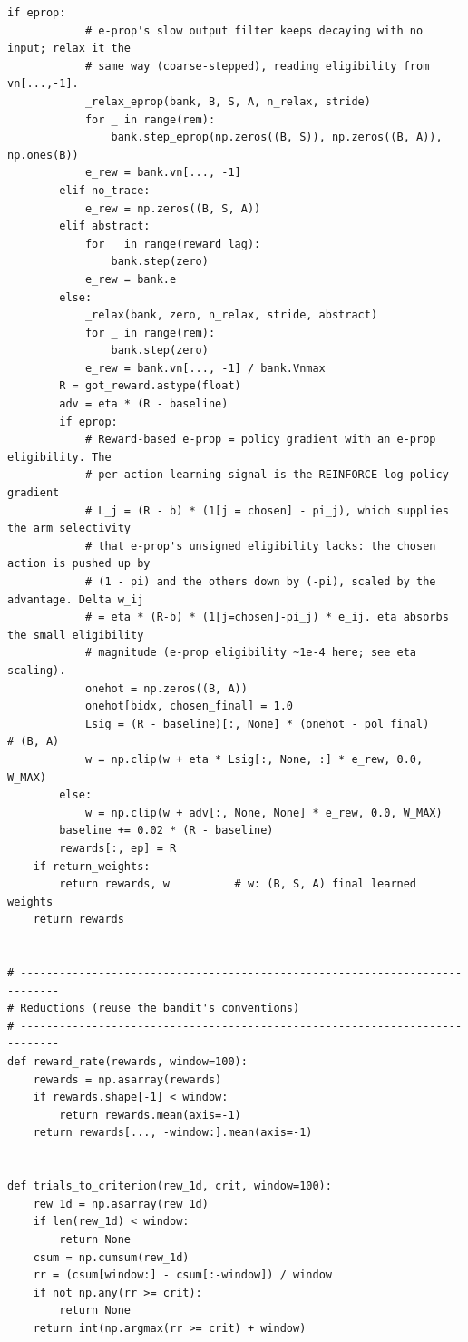 \begin{lstlisting}[caption={mrl\_trace/maze.py},label={lst:siox-src-maze}]
        if eprop:
            # e-prop's slow output filter keeps decaying with no input; relax it the
            # same way (coarse-stepped), reading eligibility from vn[...,-1].
            _relax_eprop(bank, B, S, A, n_relax, stride)
            for _ in range(rem):
                bank.step_eprop(np.zeros((B, S)), np.zeros((B, A)), np.ones(B))
            e_rew = bank.vn[..., -1]
        elif no_trace:
            e_rew = np.zeros((B, S, A))
        elif abstract:
            for _ in range(reward_lag):
                bank.step(zero)
            e_rew = bank.e
        else:
            _relax(bank, zero, n_relax, stride, abstract)
            for _ in range(rem):
                bank.step(zero)
            e_rew = bank.vn[..., -1] / bank.Vnmax
        R = got_reward.astype(float)
        adv = eta * (R - baseline)
        if eprop:
            # Reward-based e-prop = policy gradient with an e-prop eligibility. The
            # per-action learning signal is the REINFORCE log-policy gradient
            # L_j = (R - b) * (1[j = chosen] - pi_j), which supplies the arm selectivity
            # that e-prop's unsigned eligibility lacks: the chosen action is pushed up by
            # (1 - pi) and the others down by (-pi), scaled by the advantage. Delta w_ij
            # = eta * (R-b) * (1[j=chosen]-pi_j) * e_ij. eta absorbs the small eligibility
            # magnitude (e-prop eligibility ~1e-4 here; see eta scaling).
            onehot = np.zeros((B, A))
            onehot[bidx, chosen_final] = 1.0
            Lsig = (R - baseline)[:, None] * (onehot - pol_final)     # (B, A)
            w = np.clip(w + eta * Lsig[:, None, :] * e_rew, 0.0, W_MAX)
        else:
            w = np.clip(w + adv[:, None, None] * e_rew, 0.0, W_MAX)
        baseline += 0.02 * (R - baseline)
        rewards[:, ep] = R
    if return_weights:
        return rewards, w          # w: (B, S, A) final learned weights
    return rewards


# ----------------------------------------------------------------------------
# Reductions (reuse the bandit's conventions)
# ----------------------------------------------------------------------------
def reward_rate(rewards, window=100):
    rewards = np.asarray(rewards)
    if rewards.shape[-1] < window:
        return rewards.mean(axis=-1)
    return rewards[..., -window:].mean(axis=-1)


def trials_to_criterion(rew_1d, crit, window=100):
    rew_1d = np.asarray(rew_1d)
    if len(rew_1d) < window:
        return None
    csum = np.cumsum(rew_1d)
    rr = (csum[window:] - csum[:-window]) / window
    if not np.any(rr >= crit):
        return None
    return int(np.argmax(rr >= crit) + window)



\end{lstlisting}
